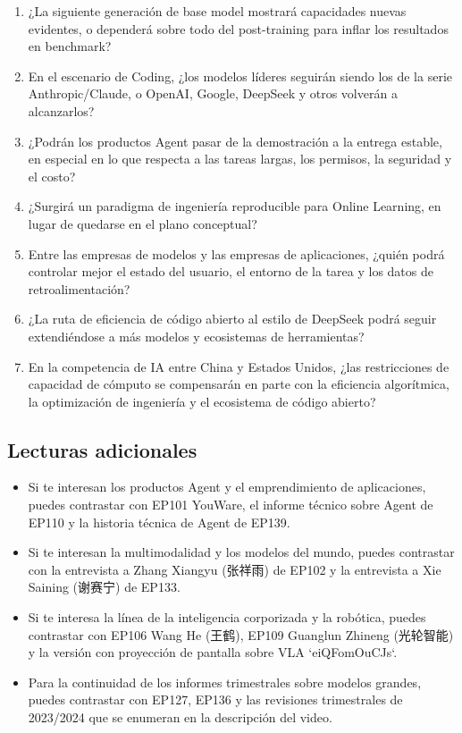 \documentclass[a4paper]{article}
\begin{document}
\begin{enumerate}
\item ¿La siguiente generación de base model mostrará capacidades nuevas evidentes, o dependerá sobre todo del post-training para inflar los resultados en benchmark?
\item En el escenario de Coding, ¿los modelos líderes seguirán siendo los de la serie Anthropic/Claude, o OpenAI, Google, DeepSeek y otros volverán a alcanzarlos?
\item ¿Podrán los productos Agent pasar de la demostración a la entrega estable, en especial en lo que respecta a las tareas largas, los permisos, la seguridad y el costo?
\item ¿Surgirá un paradigma de ingeniería reproducible para Online Learning, en lugar de quedarse en el plano conceptual?
\item Entre las empresas de modelos y las empresas de aplicaciones, ¿quién podrá controlar mejor el estado del usuario, el entorno de la tarea y los datos de retroalimentación?
\item ¿La ruta de eficiencia de código abierto al estilo de DeepSeek podrá seguir extendiéndose a más modelos y ecosistemas de herramientas?
\item En la competencia de IA entre China y Estados Unidos, ¿las restricciones de capacidad de cómputo se compensarán en parte con la eficiencia algorítmica, la optimización de ingeniería y el ecosistema de código abierto?
\end{enumerate}

\subsection{Lecturas adicionales}

\begin{itemize}
\item Si te interesan los productos Agent y el emprendimiento de aplicaciones, puedes contrastar con EP101 YouWare, el informe técnico sobre Agent de EP110 y la historia técnica de Agent de EP139.
\item Si te interesan la multimodalidad y los modelos del mundo, puedes contrastar con la entrevista a Zhang Xiangyu (张祥雨) de EP102 y la entrevista a Xie Saining (谢赛宁) de EP133.
\item Si te interesa la línea de la inteligencia corporizada y la robótica, puedes contrastar con EP106 Wang He (王鹤), EP109 Guanglun Zhineng (光轮智能) y la versión con proyección de pantalla sobre VLA `eiQFomOuCJs`.
\item Para la continuidad de los informes trimestrales sobre modelos grandes, puedes contrastar con EP127, EP136 y las revisiones trimestrales de 2023/2024 que se enumeran en la descripción del video.
\end{itemize}
\end{document}
